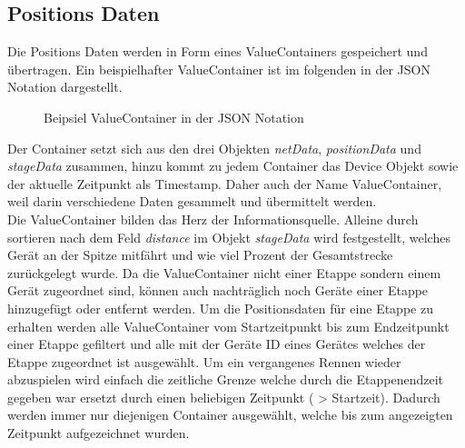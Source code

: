 \subsection{Positions Daten}
Die Positions Daten werden in Form eines ValueContainers gespeichert und übertragen. Ein beispielhafter ValueContainer ist im folgenden in der JSON Notation dargestellt.

\begin{figure}[H]
	\centering
	
	\caption{Beipsiel ValueContainer in der JSON Notation}
	\label{fig:valuecontainerjson}	
\end{figure}

Der Container setzt sich aus den drei Objekten \textit{netData}, \textit{positionData} und \textit{stageData} zusammen, hinzu kommt zu jedem Container das Device Objekt sowie der aktuelle Zeitpunkt als Timestamp. Daher auch der Name ValueContainer, weil darin verschiedene Daten gesammelt und übermittelt werden.
\\

Die ValueContainer bilden das Herz der Informationsquelle. Alleine durch sortieren nach dem Feld \textit{distance} im Objekt \textit{stageData} wird festgestellt, welches Gerät an der Spitze mitfährt und wie viel Prozent der Gesamtstrecke zurückgelegt wurde. Da die ValueContainer nicht einer Etappe sondern einem Gerät zugeordnet sind, können auch nachträglich noch Geräte einer Etappe hinzugefügt oder entfernt werden. Um die Positionsdaten für eine Etappe zu erhalten werden alle ValueContainer vom Startzeitpunkt bis zum Endzeitpunkt einer Etappe gefiltert und alle mit der Geräte ID eines Gerätes welches der Etappe zugeordnet ist ausgewählt. Um ein vergangenes Rennen wieder abzuspielen wird einfach die zeitliche Grenze welche durch die Etappenendzeit gegeben war ersetzt durch einen beliebigen Zeitpunkt ( > Startzeit). Dadurch werden immer nur diejenigen Container ausgewählt, welche bis zum angezeigten Zeitpunkt aufgezeichnet wurden.
\\


